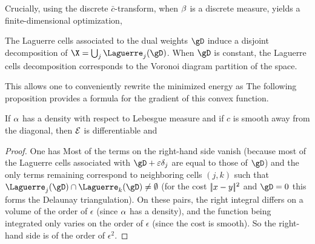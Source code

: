 Crucially, using the discrete $\bar c$-transform, when $\beta$ is a discrete measure, yields a finite-dimensional optimization, 

The Laguerre cells associated to the dual weights $\gD$
induce a disjoint decomposition of $\X = \bigcup_j \Laguerre_{j}(\gD)$. When $\gD$ is constant, the Laguerre cells decomposition corresponds to the Voronoi diagram partition of the space. 
%

This allows one to conveniently rewrite the minimized energy as
The following proposition provides a formula for the gradient of this convex function.

\begin{prop}
If $\alpha$ has a density with respect to Lebesgue measure and if $c$ is smooth away from the diagonal, then $\mathcal{E}$ is differentiable and
\end{prop}
\begin{proof} 
	One has
	Most of the terms on the right-hand side vanish (because most of the Laguerre cells associated with $\gD+\epsilon\de_j$ are equal to those of $\gD$) and the only terms remaining correspond to neighboring cells $(j,k)$ such that 
	$\Laguerre_{j}(\gD) \cap \Laguerre_{k}(\gD) \neq \emptyset$ (for the cost $|\!| x-y |\!|^2$ and $\gD=0$ this forms the Delaunay triangulation).
	On these pairs, the right integral differs on a volume of the order of $\epsilon$ (since $\alpha$ has a density), and the function being integrated only varies on the order of $\epsilon$ (since the cost is smooth). So the right-hand side is of the order of $\epsilon^2$.
\end{proof}

